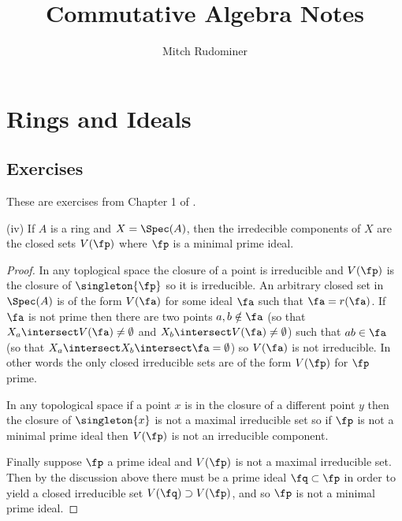 \documentclass[oneside,12pt]{amsart}
\begin{document}
\title{Commutative Algebra Notes}
\author{Mitch Rudominer}

\maketitle

\tableofcontents


\section{Rings and Ideals}


\subsection{Exercises}
These are exercises from Chapter 1 of \cite{AtiyahBook}.

\begin{exercise}[exercise 20]
(iv) If $A$ is a ring and $X=\Spec(A)$, then the irredecible components of $X$ are
the closed sets $V(\fp)$ where $\fp$ is a minimal prime ideal.
\end{exercise}
\begin{proof}
In any toplogical space the closure of a point is irreducible and $V(\fp)$ is the closure of $\singleton{\fp}$
so it is irreducible. An arbitrary closed set in $\Spec(A)$ is of the form $V(\fa)$ for
some ideal $\fa$ such that $\fa=r(\fa)$. If $\fa$ is not prime then there are two points
$a,b\notin\fa$ (so that $X_a\intersect V(\fa)\not=\emptyset$ and
$X_b\intersect V(\fa) \not=\emptyset$) such that $ab \in \fa$ (so that
$X_a\intersect X_b \intersect \fa = \emptyset$) so $V(\fa)$ is not irreducible.
In other words the only closed irreducible sets are of the form $V(\fp)$ for
$\fp$ prime.

In any topological space if a point $x$ is in the closure of a different point
$y$ then the closure of $\singleton{x}$ is not a maximal irreducible set so
if $\fp$ is not a minimal prime ideal then $V(\fp)$ is not an irreducible
component.

Finally suppose $\fp$ a prime ideal and $V(\fp)$ is not a maximal irreducible
set. Then by the discussion above there must be a prime ideal $\fq\subset\fp$
in order to yield a closed irreducible set $V(\fq)\supset V(\fp)$, and so
$\fp$ is not a minimal prime ideal.
\end{proof}
\end{document}
